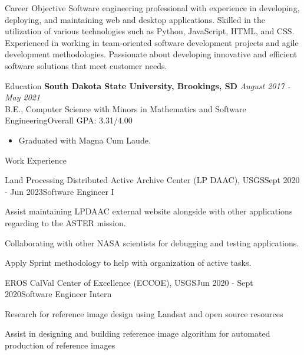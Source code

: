 \documentclass[11pt, a4paper]{resume}
\begin{document}
\begin{rSection}{Career Objective}
{\normalfont Software engineering professional with experience in developing, deploying, and maintaining web and desktop applications. Skilled in the utilization of various technologies such as Python, JavaScript, HTML, and CSS. Experienced in working in team-oriented software development projects and agile development methodologies. Passionate about developing innovative and efficient software solutions that meet customer needs.}
\end{rSection}


\begin{rSection}{Education}
{\bf South Dakota State University, Brookings, SD} \hfill {\normalfont \em August 2017 - May 2021} 
\\ {\normalfont B.E., Computer Science with Minors in Mathematics and Software Engineering}\hfill {\normalfont Overall GPA: 3.31/4.00 }
    \begin{itemize}
        \item \normalfont Graduated with Magna Cum Laude.
    \end{itemize}
\end{rSection}


\begin{rSection}{Work Experience}
\begin{rSubsection}{Land Processing Distributed Active Archive Center (LP DAAC), USGS}{\normalfont Sept 2020 - Jun 2023}{Software Engineer I}{}
 \item {\normalfont Assist maintaining LPDAAC external website alongside with other applications regarding to the ASTER mission.}
 \item {\normalfont Collaborating with other NASA scientists for debugging and testing applications.}
 \item {\normalfont Apply Sprint methodology to help with organization of active tasks.}
\end{rSubsection}
\begin{rSubsection}{EROS CalVal Center of Excellence (ECCOE), USGS}{\normalfont Jun 2020 - Sept 2020}{Software Engineer Intern}{}
 \item {\normalfont Research for reference image design using Landsat and open source resources}
 \item {\normalfont Assist in designing and building reference image algorithm for automated production of reference images}
\end{rSubsection}

\end{rSection}
\end{document}
